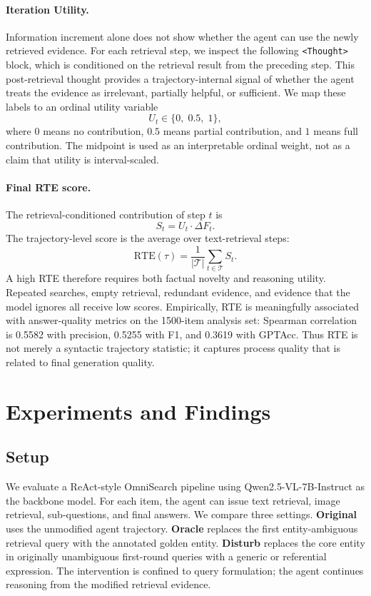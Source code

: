 \documentclass{article}
\newcommand{\rte}{\mathrm{RTE}}
\newcommand{\df}{\Delta F}
\begin{document}
\paragraph{Iteration Utility.}
Information increment alone does not show whether the agent can use the newly retrieved evidence.
For each retrieval step, we inspect the following \texttt{<Thought>} block, which is conditioned on the retrieval result from the preceding step.
This post-retrieval thought provides a trajectory-internal signal of whether the agent treats the evidence as irrelevant, partially helpful, or sufficient.
We map these labels to an ordinal utility variable
\begin{equation}
    U_t \in \{0,\;0.5,\;1\},
\end{equation}
where $0$ means no contribution, $0.5$ means partial contribution, and $1$ means full contribution.
The midpoint is used as an interpretable ordinal weight, not as a claim that utility is interval-scaled.

\paragraph{Final RTE score.}
The retrieval-conditioned contribution of step $t$ is
\begin{equation}
    S_t = U_t \cdot \df_t.
\end{equation}
The trajectory-level score is the average over text-retrieval steps:
\begin{equation}
    \rte(\tau) = \frac{1}{|\mathcal{T}|}\sum_{t\in\mathcal{T}} S_t.
\end{equation}
A high RTE therefore requires both factual novelty and reasoning utility.
Repeated searches, empty retrieval, redundant evidence, and evidence that the model ignores all receive low scores.
Empirically, RTE is meaningfully associated with answer-quality metrics on the 1500-item analysis set: Spearman correlation is 0.5582 with precision, 0.5255 with F1, and 0.3619 with GPTAcc.
Thus RTE is not merely a syntactic trajectory statistic; it captures process quality that is related to final generation quality.

\section{Experiments and Findings}
\subsection{Setup}
We evaluate a ReAct-style OmniSearch pipeline using Qwen2.5-VL-7B-Instruct as the backbone model.
For each item, the agent can issue text retrieval, image retrieval, sub-questions, and final answers.
We compare three settings.
\textbf{Original} uses the unmodified agent trajectory.
\textbf{Oracle} replaces the first entity-ambiguous retrieval query with the annotated golden entity.
\textbf{Disturb} replaces the core entity in originally unambiguous first-round queries with a generic or referential expression.
The intervention is confined to query formulation; the agent continues reasoning from the modified retrieval evidence.
\end{document}
